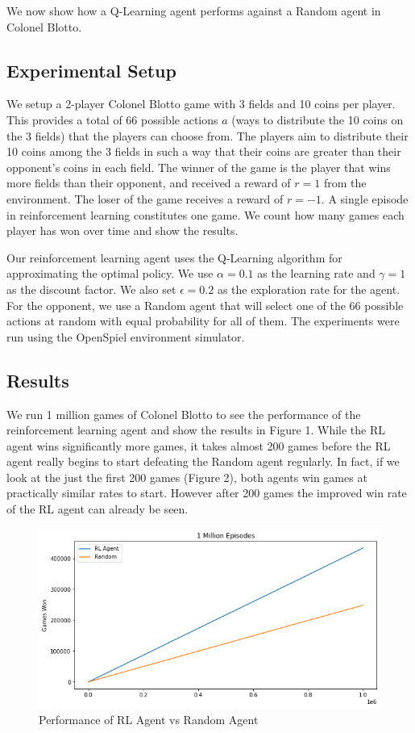 \documentclass[11pt, oneside]{article}   	%
\begin{document}
We now show how a Q-Learning agent performs against a Random agent in Colonel Blotto.

\subsection{Experimental Setup}

We setup a 2-player Colonel Blotto game with 3 fields and 10 coins per player. This provides a total of 66 possible actions $a$ (ways to distribute the 10 coins on the 3 fields) that the players can choose from. The players aim to distribute their 10 coins among the 3 fields in such a way that their coins are greater than their opponent's coins in each field. The winner of the game is the player that wins more fields than their opponent, and received a reward of $r=1$ from the environment. The loser of the game receives a reward of $r=-1$. A single episode in reinforcement learning constitutes one game. We count how many games each player has won over time and show the results.

\hfill

Our reinforcement learning agent uses the Q-Learning algorithm for approximating the optimal policy. We use $\alpha=0.1$ as the learning rate and $\gamma=1$ as the discount factor. We also set $\epsilon=0.2$ as the exploration rate for the agent. For the opponent, we use a Random agent that will select one of the 66 possible actions at random with equal probability for all of them. The experiments were run using the OpenSpiel\cite{OpenSpiel} environment simulator.


\subsection{Results}

We run 1 million games of Colonel Blotto to see the performance of the reinforcement learning agent and show the results in Figure 1. While the RL agent wins significantly more games, it takes almost 200 games before the RL agent really begins to start defeating the Random agent regularly. In fact, if we look at the just the first 200 games (Figure 2), both agents win games at practically similar rates to start. However after 200 games the improved win rate of the RL agent can already be seen.

\begin{figure}[h]
    \centering
    \includegraphics[scale=0.5]{./images/rl_random.png}
    \caption{Performance of RL Agent vs Random Agent}
    \label{fig:mesh1}
\end{figure}
\end{document}
